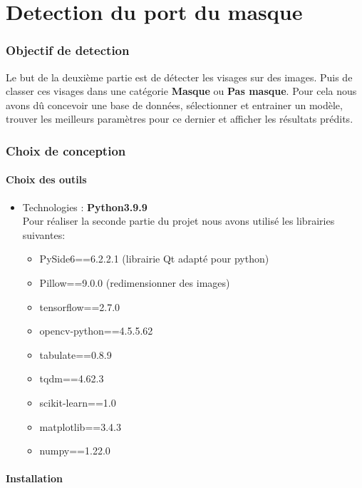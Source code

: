 
\part{Detection du port du masque}

\section{Objectif de detection}

Le but de la deuxième partie est de détecter les visages sur des images. Puis de classer ces visages dans une catégorie \textbf{Masque} ou \textbf{Pas masque}.
Pour cela nous avons dû concevoir une base de données, sélectionner et entrainer un modèle, trouver les meilleurs paramètres pour ce dernier et afficher les résultats prédits.

\section{Choix de conception}

\subsection{Choix des outils}

\begin{itemize}
\item Technologies : \textbf{Python3.9.9}\\
Pour réaliser la seconde partie du projet nous avons utilisé les librairies suivantes:\\
    \begin{itemize}
        \item PySide6==6.2.2.1 (librairie Qt adapté pour python)
        \item Pillow==9.0.0 (redimensionner des images)
        \item tensorflow==2.7.0
        \item opencv-python==4.5.5.62
        \item tabulate==0.8.9
        \item tqdm==4.62.3 
        \item scikit-learn==1.0
        \item matplotlib==3.4.3
        \item numpy==1.22.0
    \end{itemize}
\end{itemize}

\subsection{Installation}

